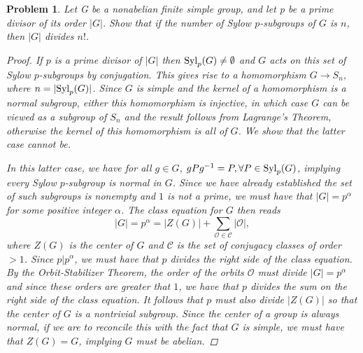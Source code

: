 \documentclass[11pt]{article}
\newcommand{\1}{\textbf{1}}
\newtheorem{prob}{Problem}
\begin{document}
\begin{prob}
Let G be a nonabelian finite simple group, and let p be a prime divisor of its order $|G|$. Show that if the number of Sylow $p$-subgroups of $G$ is $n$, then $|G|$ divides $n!$.

\begin{proof}
If $p$ is a prime divisor of $|G|$ then $\textnormal{Syl}_p(G) \neq \emptyset$ and $G$ acts on this set of Sylow $p$-subgroups by conjugation. This gives rise to a homomorphism $G\rightarrow S_n$, where $n = |\textnormal{Syl}_p(G)|$. Since $G$ is simple and the kernel of a homomorphism is a normal subgroup, either this homomorphism is injective, in which case $G$ can be viewed as a subgroup of $S_n$ and the result follows from Lagrange's Theorem, otherwise the kernel of this homomorphism is all of $G$. We show that the latter case cannot be.

In this latter case, we have for all $g\in G$, $gPg^{-1} = P, \forall P\in\textnormal{Syl}_p(G)$, implying every Sylow $p$-subgroup is normal in $G$. Since we have already established the set of such subgroups is nonempty and $1$ is not a prime, we must have that $|G| = p^\alpha$ for some positive integer $\alpha$. The class equation for $G$ then reads \[|G| = p^\alpha = |Z(G)| + \sum_{\mathcal{O}\in\mathcal{C}}|\mathcal{O}|,\] where $Z(G)$ is the center of $G$ and $\mathcal{C}$ is the set of conjugacy classes of order $>1$. Since $p| p^\alpha$, we must have that $p$ divides the right side of the class equation. By the Orbit-Stabilizer Theorem, the order of the orbits $\mathcal{O}$ must divide $|G| = p^\alpha $ and since these orders are greater that $1$, we have that $p$ divides the sum on the right side of the class equation. It follows that $p$ must also divide $|Z(G)|$ so that the center of $G$ is a nontrivial subgroup. Since the center of a group is always normal, if we are to reconcile this with the fact that $G$ is simple, we must have that $Z(G) = G$, implying $G$ must be abelian.
\end{proof}
\end{prob}
\end{document}
